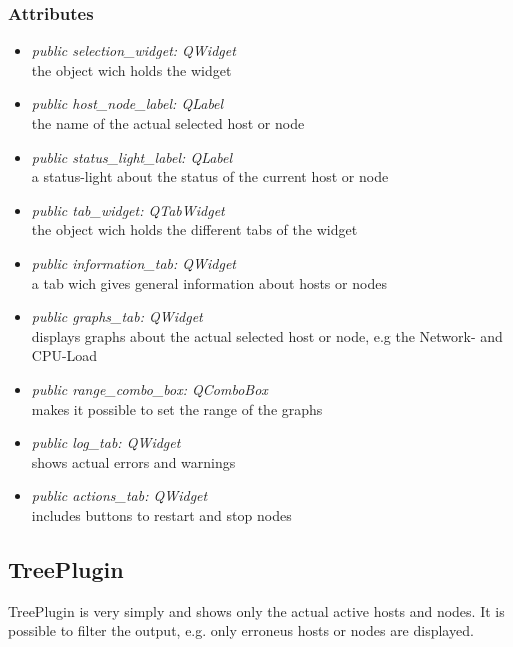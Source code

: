 \subsubsection{Attributes}
\begin{itemize}
  \item \textit{public selection\_widget: QWidget}\\
  the object wich holds the widget
  \item \textit{public host\_node\_label: QLabel}\\
  the name of the actual selected host or node
  \item \textit{public status\_light\_label: QLabel}\\
  a status-light about the status of the current host or node
  \item \textit{public tab\_widget: QTabWidget}\\
  the object wich holds the different tabs of the widget
  \item \textit{public information\_tab: QWidget}\\
  a tab wich gives general information about hosts or nodes 
  \item \textit{public graphs\_tab: QWidget}\\
  displays graphs about the actual selected host or node, e.g the Network- and
  CPU-Load
  \item \textit{public range\_combo\_box: QComboBox}\\
  makes it possible to set the range of the graphs
  \item \textit{public log\_tab: QWidget}\\
  shows actual errors and warnings
  \item \textit{public actions\_tab: QWidget}\\
  includes buttons to restart and stop nodes  
\end{itemize}

\subsection{TreePlugin}
TreePlugin is very simply and shows only the actual active hosts
and nodes. It is possible to filter the output, e.g. only erroneus hosts or
nodes are displayed.
